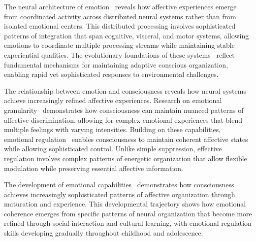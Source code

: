 The neural architecture of emotion~\cite{Davidson2012, zheng2025unbearable, Fox2019, kukushkin2024massed} reveals how affective experiences emerge from coordinated activity across distributed neural systems rather than from isolated emotional centers. This distributed processing involves sophisticated patterns of integration that span cognitive, visceral, and motor systems, allowing emotions to coordinate multiple processing streams while maintaining stable experiential qualities. The evolutionary foundations of these systems~\cite{Panksepp1998, hunt2024electromagnetic} reflect fundamental mechanisms for maintaining adaptive conscious organization, enabling rapid yet sophisticated responses to environmental challenges.

The relationship between emotion and consciousness reveals how neural systems achieve increasingly refined affective experiences. Research on emotional granularity~\cite{barrett2017emotions, da2024mathematical} demonstrates how consciousness can maintain nuanced patterns of affective discrimination, allowing for complex emotional experiences that blend multiple feelings with varying intensities. Building on these capabilities, emotional regulation~\cite{Ekman2003, zheng2025unbearable} enables consciousness to maintain coherent affective states while allowing sophisticated control. Unlike simple suppression, effective regulation involves complex patterns of energetic organization that allow flexible modulation while preserving essential affective information.

The development of emotional capabilities~\cite{Siegel2012, amil2024theta, Thompson2007, butlin2023consciousnessartificialintelligenceinsights} demonstrates how consciousness achieves increasingly sophisticated patterns of affective organization through maturation and experience. This developmental trajectory shows how emotional coherence emerges from specific patterns of neural organization that become more refined through social interaction and cultural learning, with emotional regulation skills developing gradually throughout childhood and adolescence.

